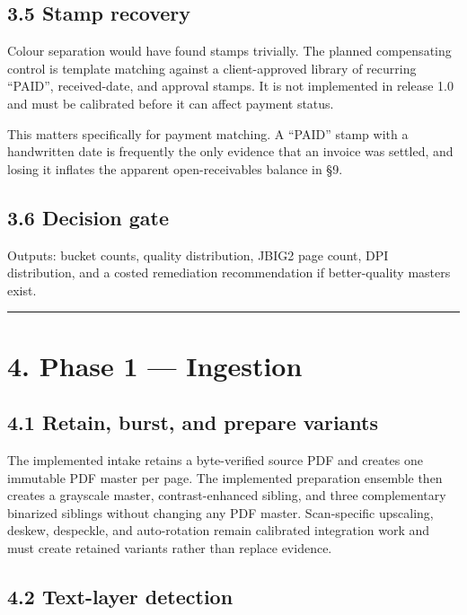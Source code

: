 \documentclass[
]{article}
\begin{document}
\subsection{3.5 Stamp recovery}\label{stamp-recovery}

Colour separation would have found stamps trivially. The planned
compensating control is template matching against a client-approved
library of recurring ``PAID'', received-date, and approval stamps. It is
not implemented in release 1.0 and must be calibrated before it can
affect payment status.

This matters specifically for payment matching. A ``PAID'' stamp with a
handwritten date is frequently the only evidence that an invoice was
settled, and losing it inflates the apparent open-receivables balance in
§9.

\subsection{3.6 Decision gate}\label{decision-gate}

Outputs: bucket counts, quality distribution, JBIG2 page count, DPI
distribution, and a costed remediation recommendation if better-quality
masters exist.

\begin{center}\rule{0.5\linewidth}{0.5pt}\end{center}

\section{4. Phase 1 --- Ingestion}\label{phase-1-ingestion}

\subsection{4.1 Retain, burst, and prepare
variants}\label{retain-burst-and-prepare-variants}

The implemented intake retains a byte-verified source PDF and creates
one immutable PDF master per page. The implemented preparation ensemble
then creates a grayscale master, contrast-enhanced sibling, and three
complementary binarized siblings without changing any PDF master.
Scan-specific upscaling, deskew, despeckle, and auto-rotation remain
calibrated integration work and must create retained variants rather
than replace evidence.

\subsection{4.2 Text-layer detection}\label{text-layer-detection}
\end{document}
